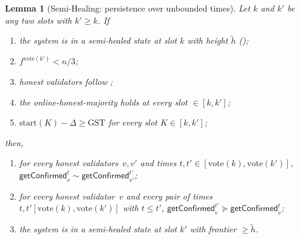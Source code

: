 \documentclass{article}
\newcommand{\start}{\ensuremath{\mathrm{start}}}
\newcommand{\vote}{\ensuremath{\mathrm{vote}}}
\newcommand{\GST}{\ensuremath{\mathrm{GST}}\xspace}
\newcommand{\comm}[1]{\ensuremath{\widetilde{#1}}}
\newcommand{\getConfirmed}{\textsf{getConfirmed}\xspace}
\theoremstyle{plain}
\newtheorem{lemma}{Lemma}
\theoremstyle{definition}
\theoremstyle{remark}
\begin{document}
\begin{lemma}[Semi-Healing: persistence over unbounded times]\label{rev:lem:semi-healing-unbounded}
Let $k$ and $k'$ be any two slots with $k'\geq k$.
If
\begin{enumerate}
  \item\label{rev:shu:hs} the system is in a semi-healed state at slot $k$ with height $\comm{h}$ ();
  \item\label{rev:shu:f-bound} $f^{\vote(k')}< n/3$;
  \item\label{rev:shu:f} honest validators follow ;
  \item\label{rev:shu:ohm} the online-honest-majority holds at every slot $\in [k,k']$;
  \item\label{rev:shu:sync} $\start(K) - \Delta \geq \GST$ for every slot $K \in [k,k']$;
\end{enumerate}
then,
\begin{enumerate}
  \item for every honest validators~$v,v'$ and times $t, t' \in [\vote(k),\vote(k')]$, $\getConfirmed_v^{t} \sim \getConfirmed_{v'}^{t'}$;
  \item for every honest validator~$v$ and every pair of times $t, t' [\vote(k),\vote(k')]$ with $t \leq t'$, $\getConfirmed_v^{t'} \succeq \getConfirmed_v^t$;
  \item the system is in a semi-healed state at slot $k'$ with frontier $\geq \comm{h}$.
\end{enumerate}
\end{lemma}
\end{document}
